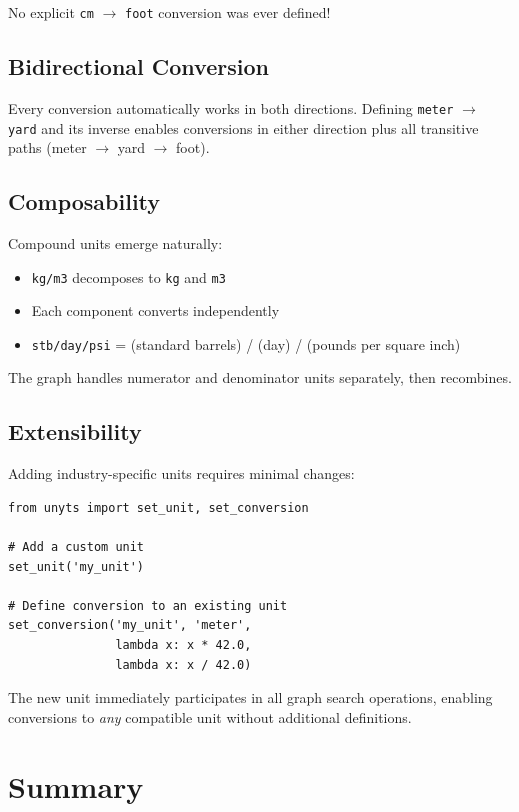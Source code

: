 \documentclass[11pt,a4paper]{report}
\begin{document}
No explicit \texttt{cm} $\rightarrow$ \texttt{foot} conversion was ever defined!

\subsection{Bidirectional Conversion}

Every conversion automatically works in both directions. Defining \texttt{meter} $\rightarrow$ \texttt{yard} and its inverse enables conversions in either direction plus all transitive paths (meter $\rightarrow$ yard $\rightarrow$ foot).

\subsection{Composability}

Compound units emerge naturally:
\begin{itemize}[leftmargin=*]
  \item \texttt{kg/m3} decomposes to \texttt{kg} and \texttt{m3}
  \item Each component converts independently
  \item \texttt{stb/day/psi} = (standard barrels) / (day) / (pounds per square inch)
\end{itemize}

The graph handles numerator and denominator units separately, then recombines.

\subsection{Extensibility}

Adding industry-specific units requires minimal changes:

\begin{lstlisting}[style=pythonstyle, caption={Adding custom units}]
from unyts import set_unit, set_conversion

# Add a custom unit
set_unit('my_unit')

# Define conversion to an existing unit
set_conversion('my_unit', 'meter', 
               lambda x: x * 42.0,
               lambda x: x / 42.0)
\end{lstlisting}

The new unit immediately participates in all graph search operations, enabling conversions to \emph{any} compatible unit without additional definitions.

\section{Summary}
\end{document}
